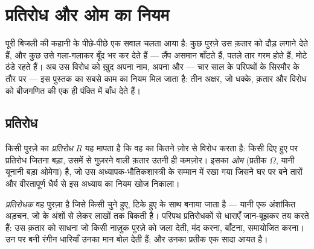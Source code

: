 \chapter{प्रतिरोध और ओम का नियम}\label{ch:g8:ohms-law}

पूरी बिजली की कहानी के पीछे-पीछे एक सवाल चलता आया है: कुछ पुरज़े उस
क़तार को दौड़ लगाने देते हैं, और कुछ उसे गला-गलाकर बूँद भर कर देते हैं
--- लैंप  असमान बाँटते हैं, पतले तार गरम होते हैं, मोटे ठंडे
रहते हैं। अब उस विरोध को ख़ुद अपना नाम, अपना  और --- चार साल के
परिपथों के सिरमौर के तौर पर --- इस पुस्तक का सबसे काम का नियम मिल जाता
है: तीन अक्षर, जो धक्के, क़तार और विरोध को बीजगणित की एक ही पंक्ति में
बाँध देते हैं।

\section{प्रतिरोध}

\begin{definition}[प्रतिरोध]\label{def:g8:ohms-law:resistance}
किसी पुरज़े का \emph{प्रतिरोध} $R$ यह मापता है कि वह
 का कितने ज़ोर से विरोध करता है: किसी दिए हुए  पर
प्रतिरोध जितना बड़ा, उसमें से गुज़रने वाली क़तार उतनी ही कमज़ोर। इसका
 \emph{ओम} (प्रतीक $\Omega$, यानी यूनानी बड़ा ओमेगा)
है, जो उस अध्यापक-भौतिकशास्त्री के सम्मान में रखा गया जिसने घर पर बने
तारों और वीरतापूर्ण धैर्य से इस अध्याय का नियम खोज निकाला।
\end{definition}

\begin{definition}[प्रतिरोधक]\label{def:g8:ohms-law:resistor}
\emph{प्रतिरोधक} वह पुरज़ा है जिसे किसी चुने हुए,
टिके हुए  के साथ बनाया जाता है --- यानी एक अंशांकित अड़चन, जो
 के अंशों से लेकर लाखों  तक बिकती है। परिपथ प्रतिरोधकों से धाराएँ
जान-बूझकर तय करते हैं: उस क़तार को साधना जो किसी नाज़ुक पुरज़े को जला
देती, मंद करना, बाँटना, समायोजित करना। उन पर बनी रंगीन धारियाँ उनका
मान बोल देती हैं; और उनका प्रतीक एक सादा आयत है।
\end{definition}

